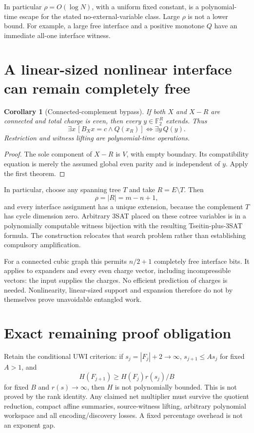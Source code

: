 \documentclass[11pt]{article}
\newtheorem{corollary}[theorem]{Corollary}
\newcommand{\F}{\mathbb F_2}
\begin{document}
In particular $\rho=O(\log N)$, with a uniform fixed constant, is a polynomial-time escape for the stated no-external-variable class. Large $\rho$ is not a lower bound. For example, a large free interface and a positive monotone $Q$ have an immediate all-one interface witness.
\section{A linear-sized nonlinear interface can remain completely free}
\begin{corollary}[Connected-complement bypass]
If both $X$ and $X-R$ are connected and total charge is even, then every $y\in\F^R$ extends. Thus
\[
\exists x\,[B_Xx=c\land Q(x_R)]
\iff
\exists y\,Q(y). \tag{3}
\]
Restriction and witness lifting are polynomial-time operations.
\end{corollary}
\begin{proof}
The sole component of $X-R$ is $V$, with empty boundary. Its compatibility equation is merely the assumed global even parity and is independent of $y$. Apply the first theorem.
\end{proof}

In particular, choose any spanning tree $T$ and take $R=E\setminus T$. Then
\[
\rho=|R|=m-n+1,
\]
and every interface assignment has a unique extension, because the complement $T$ has cycle dimension zero. Arbitrary 3SAT placed on these cotree variables is in a polynomially computable witness bijection with the resulting Tseitin-plus-3SAT formula. The construction relocates that search problem rather than establishing compulsory amplification.

For a connected cubic graph this permits $n/2+1$ completely free interface bits. It applies to expanders and every even charge vector, including incompressible vectors: the input supplies the charges. No efficient prediction of charges is needed. Nonlinearity, linear-sized support and expansion therefore do not by themselves prove unavoidable entangled work.
\section{Exact remaining proof obligation}
Retain the conditional UWI criterion: if $s_j=|F_j|+2\to\infty$, $s_{j+1}\le As_j$ for fixed $A>1$, and
\[
H(F_{j+1})\ge H(F_j)r(s_j)/B
\]
for fixed $B$ and $r(s)\to\infty$, then $H$ is not polynomially bounded. This is not proved by the rank identity. Any claimed net multiplier must survive the quotient reduction, compact affine summaries, source-witness lifting, arbitrary polynomial workspace and all encoding/discovery losses. A fixed percentage overhead is not an exponent gap.
\end{document}
